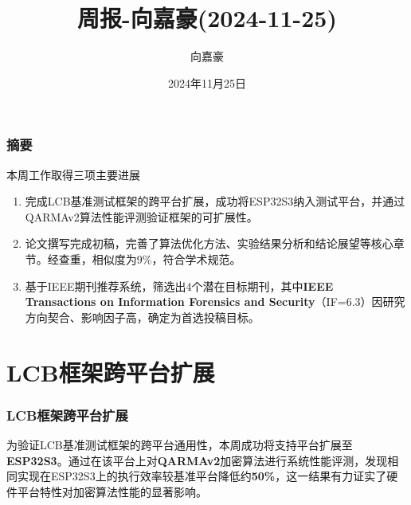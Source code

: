 \documentclass{beamer}
\title{\textbf{周报-向嘉豪(2024-11-25)}}
\author{向嘉豪}
\institute{衡阳师范学院}
\date{2024年11月25日}
\begin{document}
\begin{frame}
    \titlepage
\end{frame}

\begin{frame}
    \frametitle{摘要}
       \begin{block}{本周工作取得三项主要进展}
        \begin{enumerate}
            \item 完成LCB基准测试框架的跨平台扩展，成功将ESP32S3纳入测试平台，并通过QARMAv2算法性能评测验证框架的可扩展性。
            \item 论文撰写完成初稿，完善了算法优化方法、实验结果分析和结论展望等核心章节。经查重，相似度为9\%，符合学术规范。
            \item 基于IEEE期刊推荐系统，筛选出4个潜在目标期刊，其中\textbf{IEEE Transactions on Information Forensics and Security}（IF=6.3）因研究方向契合、影响因子高，确定为首选投稿目标。
        \end{enumerate}
    \end{block}
\end{frame}


\section{LCB框架跨平台扩展}
\begin{frame}
    \frametitle{LCB框架跨平台扩展}
    为验证LCB基准测试框架的跨平台通用性，本周成功将支持平台扩展至\textbf{ESP32S3}。通过在该平台上对\textbf{QARMAv2}加密算法进行系统性能评测，发现相同实现在ESP32S3上的执行效率较基准平台降低约\textbf{50\%}，这一结果有力证实了硬件平台特性对加密算法性能的显著影响。
\end{frame}
\end{document}
